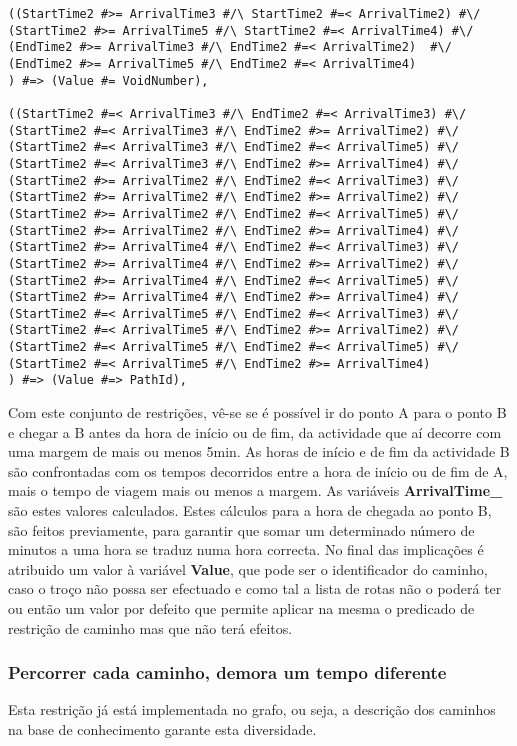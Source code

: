 \documentclass[runningheads]{llncs}
\begin{document}
\begin{lstlisting}
((StartTime2 #>= ArrivalTime3 #/\ StartTime2 #=< ArrivalTime2) #\/
(StartTime2 #>= ArrivalTime5 #/\ StartTime2 #=< ArrivalTime4) #\/
(EndTime2 #>= ArrivalTime3 #/\ EndTime2 #=< ArrivalTime2)  #\/
(EndTime2 #>= ArrivalTime5 #/\ EndTime2 #=< ArrivalTime4)
) #=> (Value #= VoidNumber),

((StartTime2 #=< ArrivalTime3 #/\ EndTime2 #=< ArrivalTime3) #\/
(StartTime2 #=< ArrivalTime3 #/\ EndTime2 #>= ArrivalTime2) #\/
(StartTime2 #=< ArrivalTime3 #/\ EndTime2 #=< ArrivalTime5) #\/
(StartTime2 #=< ArrivalTime3 #/\ EndTime2 #>= ArrivalTime4) #\/
(StartTime2 #>= ArrivalTime2 #/\ EndTime2 #=< ArrivalTime3) #\/
(StartTime2 #>= ArrivalTime2 #/\ EndTime2 #>= ArrivalTime2) #\/
(StartTime2 #>= ArrivalTime2 #/\ EndTime2 #=< ArrivalTime5) #\/
(StartTime2 #>= ArrivalTime2 #/\ EndTime2 #>= ArrivalTime4) #\/
(StartTime2 #>= ArrivalTime4 #/\ EndTime2 #=< ArrivalTime3) #\/
(StartTime2 #>= ArrivalTime4 #/\ EndTime2 #>= ArrivalTime2) #\/
(StartTime2 #>= ArrivalTime4 #/\ EndTime2 #=< ArrivalTime5) #\/
(StartTime2 #>= ArrivalTime4 #/\ EndTime2 #>= ArrivalTime4) #\/
(StartTime2 #=< ArrivalTime5 #/\ EndTime2 #=< ArrivalTime3) #\/
(StartTime2 #=< ArrivalTime5 #/\ EndTime2 #>= ArrivalTime2) #\/
(StartTime2 #=< ArrivalTime5 #/\ EndTime2 #=< ArrivalTime5) #\/
(StartTime2 #=< ArrivalTime5 #/\ EndTime2 #>= ArrivalTime4)
) #=> (Value #=> PathId),
\end{lstlisting}

Com este conjunto de restrições, vê-se se é possível ir do ponto A para o ponto B e chegar a B antes da hora de início ou de fim, da actividade que aí decorre com uma margem de mais ou menos 5min. As horas de início e de fim da actividade B são confrontadas com os tempos decorridos entre a hora de início ou de fim de A, mais o tempo de viagem mais ou menos a margem. As variáveis \textbf{ArrivalTime\_} são estes valores calculados. Estes cálculos para a hora de chegada ao ponto B, são feitos previamente, para garantir que somar um determinado número de minutos a uma hora se traduz numa hora correcta. No final das implicações é atribuido um valor à variável \textbf{Value}, que pode ser o identificador do caminho, caso o troço não possa ser efectuado e como tal a lista de rotas não o poderá ter ou então um valor por defeito que permite aplicar na mesma o predicado de restrição de caminho mas que não terá efeitos.

\subsubsection{Percorrer cada caminho, demora um tempo diferente} Esta restrição já está implementada no grafo, ou seja, a descrição dos caminhos na base de conhecimento garante esta diversidade.
\end{document}
